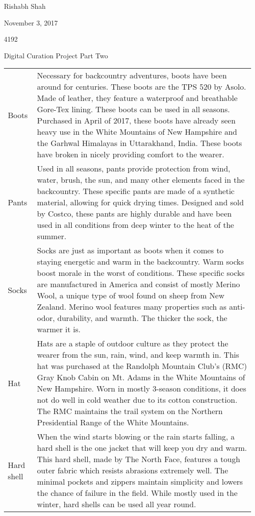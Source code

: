 \documentclass[11pt]{article}
\begin{document}
{\large \noindent Rishabh Shah

\noindent November 3, 2017

 4192

\noindent Digital Curation Project Part Two}

\begin{center}
	\begin{longtable}{>{\raggedleft\arraybackslash}p{1in} >{\raggedright\arraybackslash}p{5.5in}}
		Boots & Necessary for backcountry adventures, boots have been around for centuries. These boots are the TPS 520 by Asolo. Made of leather, they feature a waterproof and breathable Gore-Tex lining. These boots can be used in all seasons. Purchased in April of 2017, these boots have already seen heavy use in the White Mountains of New Hampshire and the Garhwal Himalayas in Uttarakhand, India. These boots have broken in nicely providing comfort to the wearer.\\
		Pants & Used in all seasons, pants provide protection from wind, water, brush, the sun, and many other elements faced in the backcountry. These specific pants are made of a synthetic material, allowing for quick drying times. Designed and sold by Costco, these pants are highly durable and have been used in all conditions from deep winter to the heat of the summer.\\
		Socks & Socks are just as important as boots when it comes to staying energetic and warm in the backcountry. Warm socks boost morale in the worst of conditions. These specific socks are manufactured in America and consist of mostly Merino Wool, a unique type of wool found on sheep from New Zealand. Merino wool features many properties such as anti-odor, durability, and warmth. The thicker the sock, the warmer it is.\\
		Hat & Hats are a staple of outdoor culture as they protect the wearer from the sun, rain, wind, and keep warmth in. This hat was purchased at the Randolph Mountain Club's (RMC) Gray Knob Cabin on Mt. Adams in the White Mountains of New Hampshire. Worn in mostly 3-season conditions, it does not do well in cold weather due to its cotton construction. The RMC maintains the trail system on the Northern Presidential Range of the White Mountains.\\
		Hard shell & When the wind starts blowing or the rain starts falling, a hard shell is the one jacket that will keep you dry and warm. This hard shell, made by The North Face, features a tough outer fabric which resists abrasions extremely well. The minimal pockets and zippers maintain simplicity and lowers the chance of failure in the field. While mostly used in the winter, hard shells can be used all year round.\\

\end{longtable}
\end{center}
\end{document}
